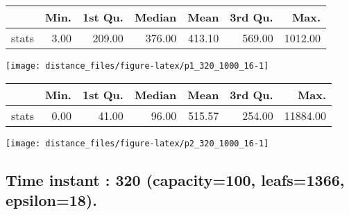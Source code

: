 \documentclass[
  9pt,
  landscape]{article}
\begin{document}
\begin{minipage}{0.5\textwidth} 
\centering 
\begin{tabular}{rrrrrrr}
  \hline
 & Min. & 1st Qu. & Median & Mean & 3rd Qu. & Max. \\ 
  \hline
stats & 3.00 & 209.00 & 376.00 & 413.10 & 569.00 & 1012.00 \\ 
   \hline
\end{tabular}
\vspace{0.5cm} 


\texttt{[image: distance\_files/figure-latex/p1\_320\_1000\_16-1]} 

\end{minipage} 
\begin{minipage}{0.5\textwidth} 
\centering 
\begin{tabular}{rrrrrrr}
  \hline
 & Min. & 1st Qu. & Median & Mean & 3rd Qu. & Max. \\ 
  \hline
stats & 0.00 & 41.00 & 96.00 & 515.57 & 254.00 & 11884.00 \\ 
   \hline
\end{tabular}
\vspace{0.5cm} 


\texttt{[image: distance\_files/figure-latex/p2\_320\_1000\_16-1]} 

\end{minipage}

\pagebreak

\hypertarget{time-instant-320-capacity100-leafs1366-epsilon18.}{%
\subsection{Time instant : 320 (capacity=100, leafs=1366,
epsilon=18).}\label{time-instant-320-capacity100-leafs1366-epsilon18.}}
\end{document}
